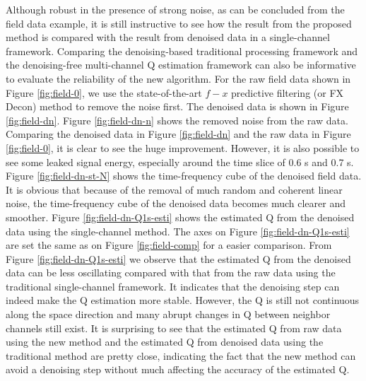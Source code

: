 Although robust in the presence of strong noise, as can be concluded from the field data example, it is still instructive to see how the result from the proposed method is compared with the result from denoised data in a single-channel framework. Comparing the denoising-based traditional processing framework and the denoising-free multi-channel Q estimation framework can also be informative to evaluate the reliability of the new algorithm. For the raw field data shown in Figure \ref{fig:field-0}, we use the state-of-the-art $f-x$ predictive filtering (or FX Decon) method \cite[]{canales1984} to remove the noise first. The denoised data is shown in Figure \ref{fig:field-dn}. Figure \ref{fig:field-dn-n} shows the removed noise from the raw data.
Comparing the denoised data in Figure \ref{fig:field-dn} and the raw data in Figure \ref{fig:field-0}, it is clear to see the huge improvement. However, it is also possible to see some leaked signal energy, especially around the time slice of 0.6 s and 0.7 s. Figure \ref{fig:field-dn-st-N} shows the time-frequency cube of the denoised field data. It is obvious that because of the removal of much random and coherent linear noise, the time-frequency cube of the denoised data becomes much clearer and smoother. Figure \ref{fig:field-dn-Q1s-esti} shows the estimated Q from the denoised data using the single-channel method. The axes on Figure \ref{fig:field-dn-Q1s-esti} are set the same as on Figure \ref{fig:field-comp} for a easier comparison. From Figure \ref{fig:field-dn-Q1s-esti} we observe that the estimated Q from the denoised data can be less oscillating compared with that from the raw data using the traditional single-channel framework. It indicates that the denoising step can indeed make the Q estimation more stable. However, the Q is still not continuous along the space direction and many abrupt changes in Q between neighbor channels still exist. It is surprising to see that the estimated Q from raw data using the new method and the estimated Q from denoised data using the traditional method are pretty close, indicating the fact that the new method can avoid a denoising step without much affecting the accuracy of the estimated Q. 




